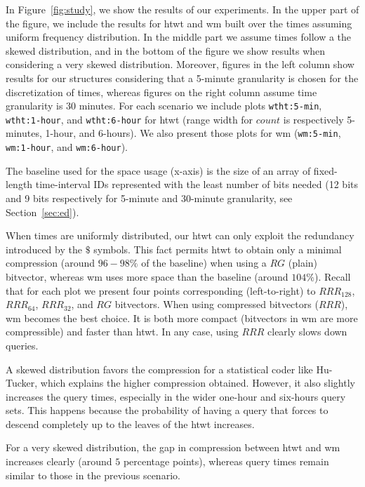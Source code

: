 	In Figure~\ref{fig:study}, we show the results of our experiments. In the upper part of the figure, we 
	include the results for \gls{htwt} and \gls{wm} built over the times assuming uniform frequency distribution.
	In the middle part we assume times follow a the skewed distribution, and in the bottom of the figure we show
	results when considering a very skewed distribution. Moreover, figures in the left column show results
	for our structures considering that a 5-minute granularity is chosen for the discretization of times, whereas
	figures on the right column assume time granularity is 30 minutes. For each scenario we include plots
	\texttt{wtht:5-min}, \texttt{wtht:1-hour}, and \texttt{wtht:6-hour} for \gls{htwt} (range width for $count$ is respectively
	5-minutes, 1-hour, and 6-hours). We also present those plots for \gls{wm} (\texttt{wm:5-min}, \texttt{wm:1-hour}, and \texttt{wm:6-hour}).

	The baseline used for the space usage (x-axis) is the size of an array of
	fixed-length time-interval IDs represented with the least number of bits needed (12 bits and 9 bits
	respectively for 5-minute and 30-minute granularity, see Section~\ref{sec:ed}).
	\medskip


	When times are uniformly distributed, our \gls{htwt} can only exploit the redundancy introduced by
	the $\$$ symbols. This fact permits \gls{htwt} to obtain only a minimal compression (around $96-98\%$ of the baseline)
	when using a $RG$ (plain) bitvector, whereas \gls{wm} uses more space than the baseline (around $104\%$).
	Recall that for each plot we present four points corresponding (left-to-right) 
	to $RRR_{128}$, $RRR_{64}$, $RRR_{32}$, and $RG$ bitvectors.
	When using compressed  bitvectors ($RRR$), \gls{wm} becomes the best choice. It is both more compact 
	(bitvectors in \gls{wm} are more compressible) and faster than \gls{htwt}. 
	In any case, using $RRR$ clearly slows down queries.

	A skewed distribution favors the compression for a statistical coder like Hu-Tucker,
	which explains the higher compression obtained. However,
	it also slightly increases the query times, especially in the wider
	one-hour and six-hours query sets. This happens because the probability of having a query 
	that forces to descend completely up to the leaves of the \gls{htwt} increases.

	For a very skewed distribution, the gap in compression between \gls{htwt} and \gls{wm} increases clearly (around 
	$5$ percentage points), whereas query times remain similar to those in the previous scenario.

